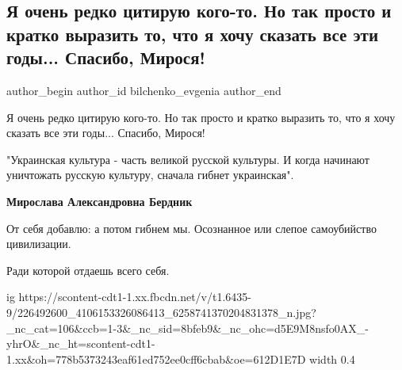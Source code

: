  
 
 
 
 
 
\subsection{Я очень редко цитирую кого-то. Но так просто и кратко выразить то, что я хочу сказать все эти годы... Спасибо, Мирося!}
\label{sec:30_07_2021.fb.bilchenko_evgenia.1.spasibo_mirosja_citata}
 
\ifcmt
 author_begin
   author_id bilchenko_evgenia
 author_end
\fi

Я очень редко цитирую кого-то. Но так просто и кратко выразить то, что я хочу
сказать все эти годы... Спасибо, Мирося!

"Украинская культура - часть великой русской культуры. И когда начинают
уничтожать русскую культуру, сначала гибнет украинская".

\textbf{Мирослава Александровна Бердник} 

От себя добавлю: а потом гибнем мы. Осознанное или слепое самоубийство цивилизации. 

Ради которой отдаешь всего себя.

\ifcmt
  ig https://scontent-cdt1-1.xx.fbcdn.net/v/t1.6435-9/226492600_4106153326086413_6258741370204831378_n.jpg?_nc_cat=106&ccb=1-3&_nc_sid=8bfeb9&_nc_ohc=d5E9M8nsfo0AX_-yhrO&_nc_ht=scontent-cdt1-1.xx&oh=778b5373243eaf61ed752ee0cff6cbab&oe=612D1E7D
  width 0.4
\fi

